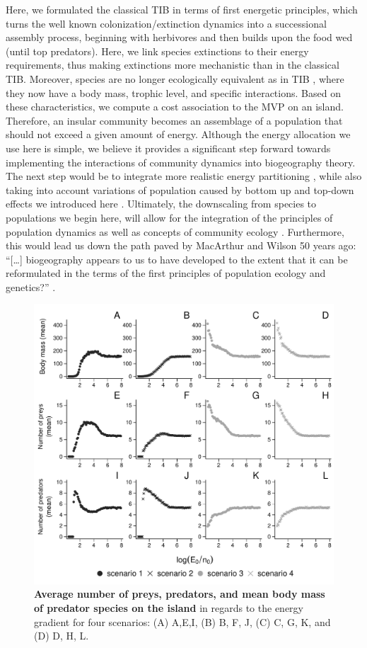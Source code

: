 Here, we formulated the classical TIB in terms of first energetic
principles, which turns the well known colonization/extinction dynamics
into a successional assembly process, beginning with herbivores and then
builds upon the food wed (until top predators). Here, we link species
extinctions to their energy requirements, thus making extinctions more
mechanistic than in the classical TIB. Moreover, species are no longer
ecologically equivalent as in TIB \citep{Lomolino2009}, where they now
have a body mass, trophic level, and specific interactions. Based on
these characteristics, we compute a cost association to the MVP on an
island. Therefore, an insular community becomes an assemblage of a
population that should not exceed a given amount of energy. Although the
energy allocation we use here is simple, we believe it provides a
significant step forward towards implementing the interactions of
community dynamics into biogeography theory. The next step would be to
integrate more realistic energy partitioning \citep{DeRuiter1995}, while
also taking into account variations of population caused by bottom up
and top-down effects we introduced here \citep{Terborgh2001, Brown2013}.
Ultimately, the downscaling from species to populations we begin here,
will allow for the integration of the principles of population dynamics
as well as concepts of community ecology \citep[\emph{i.e.}, stability
of a community][]{Allesina2012a}. Furthermore, this would lead us down
the path paved by MacArthur and Wilson 50 years ago: ``{[}\ldots{}{]}
biogeography appears to us to have developed to the extent that it can
be reformulated in the terms of the first principles of population
ecology and genetics?'' \citep[p.183]{MacArthur1967}.

\begin{figure}[htbp]
\centering
\includegraphics{fig/fig4.pdf}
\caption{\textbf{Average number of preys, predators, and mean body mass
of predator species on the island} in regards to the energy gradient for
four scenarios: (A) A,E,I, (B) B, F, J, (C) C, G, K, and (D) D, H,
L.\label{fig:etib4}}
\end{figure}

